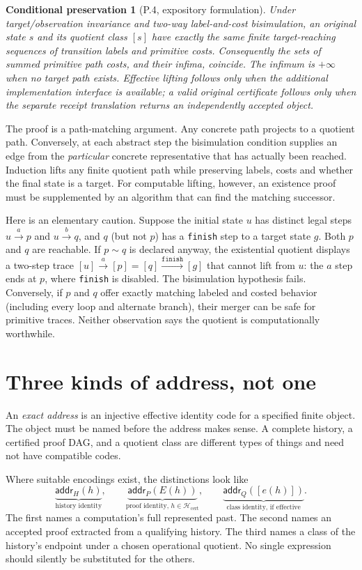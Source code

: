 \documentclass[11pt,letterpaper]{article}
\theoremstyle{plaincompact}
\newtheorem*{preservation}{Conditional preservation}
\newcommand{\hist}{\mathcal H}
\newcommand{\cert}{\hist_{\mathrm{cert}}}
\newcommand{\addr}{\mathsf{addr}}
\begin{document}
\begin{preservation}[P.4, expository formulation]
Under target/observation invariance and two-way label-and-cost bisimulation, an original state $s$ and its quotient class $[s]$ have exactly the same finite target-reaching sequences of transition labels and primitive costs. Consequently the sets of summed primitive path costs, and their infima, coincide. The infimum is $+\infty$ when no target path exists. Effective lifting follows only when the additional implementation interface is available; a valid original certificate follows only when the separate receipt translation returns an independently accepted object.
\end{preservation}

The proof is a path-matching argument. Any concrete path projects to a quotient path. Conversely, at each abstract step the bisimulation condition supplies an edge from the \emph{particular} concrete representative that has actually been reached. Induction lifts any finite quotient path while preserving labels, costs and whether the final state is a target. For computable lifting, however, an existence proof must be supplemented by an algorithm that can find the matching successor.

Here is an elementary caution. Suppose the initial state $u$ has distinct legal steps $u\xrightarrow{a}p$ and $u\xrightarrow{b}q$, and $q$ (but not $p$) has a \texttt{finish} step to a target state $g$. Both $p$ and $q$ are reachable. If $p\sim q$ is declared anyway, the existential quotient displays a two-step trace $[u]\xrightarrow{a}[p]=[q]\xrightarrow{\texttt{finish}}[g]$ that cannot lift from $u$: the $a$ step ends at $p$, where \texttt{finish} is disabled. The bisimulation hypothesis fails. Conversely, if $p$ and $q$ offer exactly matching labeled and costed behavior (including every loop and alternate branch), their merger can be safe for primitive traces. Neither observation says the quotient is computationally worthwhile.

\section{Three kinds of address, not one}
An \emph{exact address} is an injective effective identity code for a specified finite object. The object must be named before the address makes sense. A complete history, a certified proof DAG, and a quotient class are different types of things and need not have compatible codes.

Where suitable encodings exist, the distinctions look like
\[
\underbrace{\addr_H(h)}_{\text{history identity}},\qquad
\underbrace{\addr_P(E(h))}_{\text{proof identity, }h\in\cert},\qquad
\underbrace{\addr_Q([e(h)])}_{\text{class identity, if effective}}.
\]
The first names a computation's full represented past. The second names an accepted proof extracted from a qualifying history. The third names a class of the history's endpoint under a chosen operational quotient. No single expression should silently be substituted for the others.
\end{document}
